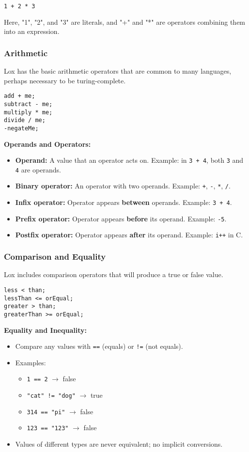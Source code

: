 \documentclass[12pt,a4paper]{article}
\begin{document}
\begin{verbatim}
1 + 2 * 3
\end{verbatim}

Here, "1", "2", and "3" are literals, and "+" and "*" are operators combining them into an expression.

\subsubsection{Arithmetic}
Lox has the basic arithmetic operators that are common to many languages, perhaps necessary to be turing-complete.
\begin{lstlisting}
add + me;
subtract - me;
multiply * me;
divide / me;
-negateMe;
\end{lstlisting}
\textbf{Operands and Operators:}
\begin{itemize}
	\item \textbf{Operand:} A value that an operator acts on. Example: in \texttt{3 + 4}, both \texttt{3} and \texttt{4} are operands.
	\item \textbf{Binary operator:} An operator with two operands. Example: \texttt{+}, \texttt{-}, \texttt{*}, \texttt{/}.
	\item \textbf{Infix operator:} Operator appears \textbf{between} operands. Example: \texttt{3 + 4}.
	\item \textbf{Prefix operator:} Operator appears \textbf{before} its operand. Example: \texttt{-5}.
	\item \textbf{Postfix operator:} Operator appears \textbf{after} its operand. Example: \texttt{i++} in C.
\end{itemize}

\subsubsection{Comparison and Equality}
Lox includes comparison operators that will produce a true or false value.
\begin{lstlisting}
less < than;
lessThan <= orEqual;
greater > than;
greaterThan >= orEqual;
\end{lstlisting}
\textbf{Equality and Inequality:}
\begin{itemize}
	\item Compare any values with \texttt{==} (equals) or \texttt{!=} (not equals).
	\item Examples:
	      \begin{itemize}
		      \item \texttt{1 == 2} \(\rightarrow\) false
		      \item \texttt{"cat" != "dog"} \(\rightarrow\) true
		      \item \texttt{314 == "pi"} \(\rightarrow\) false
		      \item \texttt{123 == "123"} \(\rightarrow\) false
	      \end{itemize}
	\item Values of different types are never equivalent; no implicit conversions.
\end{itemize}
\end{document}
